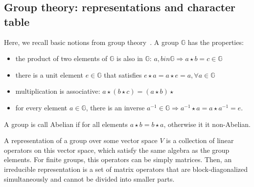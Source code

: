\subsection{Group theory: representations and character table}
Here, we recall basic notions from group theory~\cite{dresselhaus2007group}. A group $\mathbb{G}$ has the properties:
\begin{itemize}
\item the product of two elements of $\mathbb{G}$ is also in $\mathbb{G}$: $a, b 
in \mathbb{G} \Rightarrow a \star b = c \in \mathbb{G}$
\item there is a unit element $e \in \mathbb{G}$ that satisfies $e \star a = a \star e = a,  \forall a \in \mathbb{G}$
\item multiplication is associative: $a \star ( b \star c) = (a \star b) \star$
\item for every element $a \in \mathbb{G}$, there is an inverse $a^{-1} \in \mathbb{G} \Rightarrow a^{-1} \star a = a \star a^{-1} = e$.
\end{itemize}
A group is call Abelian if for all elements $a \star b = b \star a$, otherwise it it non-Abelian.

A representation of a group over some vector space $V$ is a collection of linear operators on  this  vector  space,  which  satisfy  the  same  algebra  as  the  group  elements. For finite groups, this operators can be simply matrices. Then, an irreducible representation is a set of matrix operators that are block-diagonalized simultaneously and cannot be divided into smaller parts.
